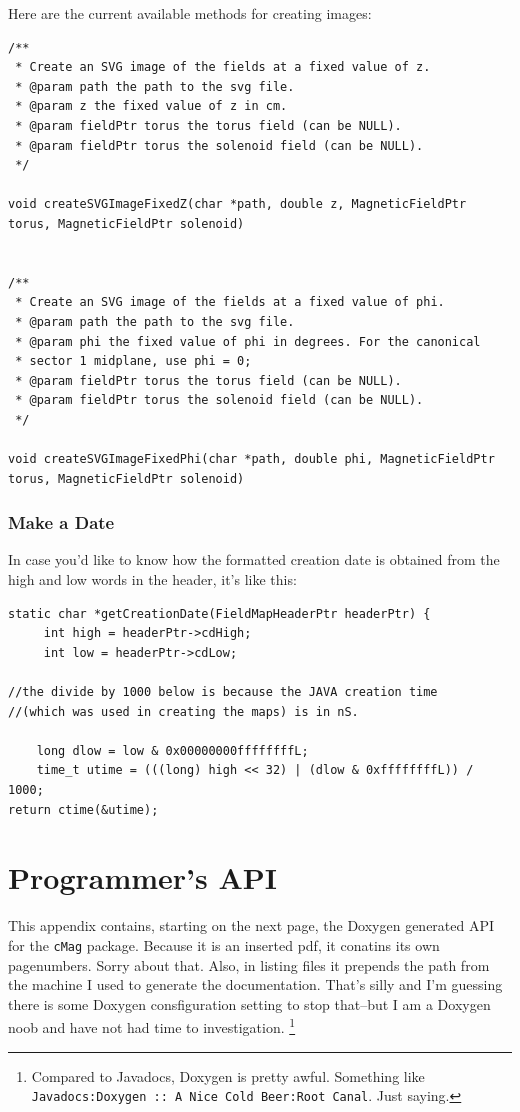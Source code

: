 \documentclass{article}
\begin{document}
Here are the current available methods for creating images:
\begin{verbatim}
/**
 * Create an SVG image of the fields at a fixed value of z.
 * @param path the path to the svg file.
 * @param z the fixed value of z in cm.
 * @param fieldPtr torus the torus field (can be NULL).
 * @param fieldPtr torus the solenoid field (can be NULL).
 */

void createSVGImageFixedZ(char *path, double z, MagneticFieldPtr torus, MagneticFieldPtr solenoid) 


/**
 * Create an SVG image of the fields at a fixed value of phi.
 * @param path the path to the svg file.
 * @param phi the fixed value of phi in degrees. For the canonical
 * sector 1 midplane, use phi = 0;
 * @param fieldPtr torus the torus field (can be NULL).
 * @param fieldPtr torus the solenoid field (can be NULL).
 */

void createSVGImageFixedPhi(char *path, double phi, MagneticFieldPtr torus, MagneticFieldPtr solenoid)
\end{verbatim}

\subsubsection{Make a Date}
In case you'd like to know how the formatted creation date is obtained from the high and low words in the header, it's like this:
\begin{verbatim}
static char *getCreationDate(FieldMapHeaderPtr headerPtr) {
     int high = headerPtr->cdHigh;
     int low = headerPtr->cdLow;

//the divide by 1000 below is because the JAVA creation time 
//(which was used in creating the maps) is in nS.

    long dlow = low & 0x00000000ffffffffL;
    time_t utime = (((long) high << 32) | (dlow & 0xffffffffL)) / 1000;
return ctime(&utime);

\end{verbatim}

\newpage
\appendix
\section{Programmer's API}
This appendix contains, starting on the next page, the Doxygen generated API for the \texttt{cMag} package. Because it is an inserted pdf, it conatins its own pagenumbers. Sorry about that. Also, in listing files it prepends the path from the machine I used to generate the documentation. That's silly and I'm guessing there is some Doxygen consfiguration setting to stop that--but I am a Doxygen noob and have not had time to investigation. \footnote{Compared to Javadocs, Doxygen is pretty awful. Something like \texttt{Javadocs:Doxygen\ ::\ A Nice Cold Beer:Root Canal}. Just saying.}

\newpage
\end{document}
